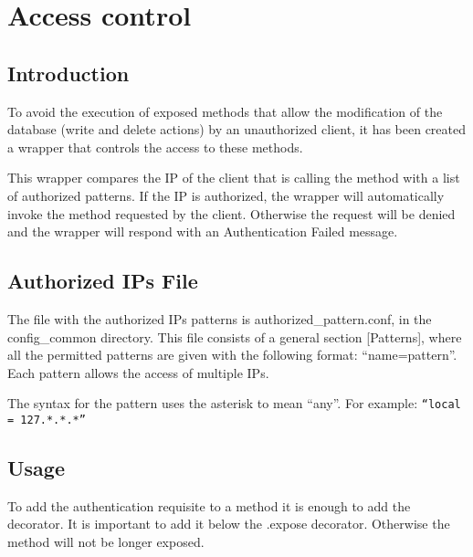 \section{Access control}
\label{sec:Access_control}
\subsection{Introduction}
To avoid the execution of exposed methods that allow the modification of the database (write and delete actions) by an unauthorized 
client, it has been created a wrapper that controls the access to these methods.

This wrapper compares the IP of the client that is calling the method with a list of authorized patterns. If the IP is authorized, 
the wrapper will automatically invoke the method requested by the client. Otherwise the request will be denied and the wrapper will 
respond with an Authentication Failed message.


\subsection{Authorized IPs File}
The file with the authorized IPs patterns is authorized\_pattern.conf, in the config\_common directory. This file consists
of a general section [Patterns], where all the permitted patterns are given with the following format: ``name=pattern''. Each pattern
allows the access of multiple IPs. 

The syntax for the pattern uses the asterisk to mean ``any''. For example: {\tt``local = 127.*.*.*''}

\subsection{Usage}
To add the authentication requisite to a method it is enough to add the {\tt@authenticate} decorator. It is important to add it 
below the {\tt@cherrypy.expose} decorator. Otherwise the method will not be longer exposed.
